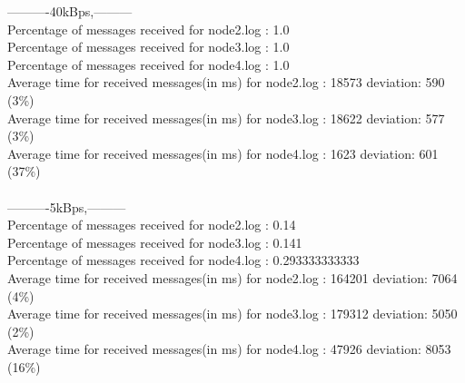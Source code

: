         ----------40kBps,---------\\
        Percentage of messages received for node2.log : 1.0\\
        Percentage of messages received for node3.log : 1.0\\
        Percentage of messages received for node4.log : 1.0\\
        Average time for received messages(in ms) for  node2.log : 18573 	deviation: 590 (3\%)\\
        Average time for received messages(in ms) for  node3.log : 18622 	deviation: 577 (3\%)\\
        Average time for received messages(in ms) for  node4.log : 1623 	deviation: 601 (37\%)\\\\
        ----------5kBps,---------\\
        Percentage of messages received for node2.log : 0.14\\
        Percentage of messages received for node3.log : 0.141\\
        Percentage of messages received for node4.log : 0.293333333333\\
        Average time for received messages(in ms) for  node2.log : 164201 	deviation: 7064 (4\%)\\
        Average time for received messages(in ms) for  node3.log : 179312 	deviation: 5050 (2\%)\\
        Average time for received messages(in ms) for  node4.log : 47926 	deviation: 8053 (16\%)\\\\
